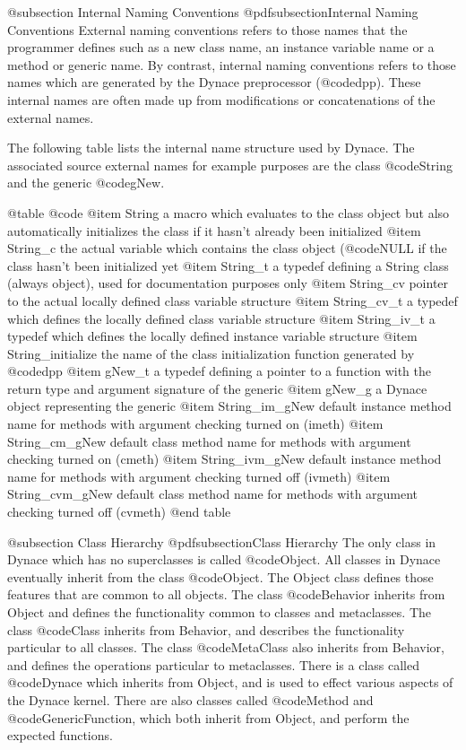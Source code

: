 @subsection Internal Naming Conventions
@pdfsubsection{Internal Naming Conventions}
External naming conventions refers to those names that the programmer
defines such as a new class name, an instance variable name or a method
or generic name.  By contrast, internal naming conventions refers to
those names which are generated by the Dynace preprocessor (@code{dpp}).
These internal names are often made up from modifications or
concatenations of the external names.

The following table lists the internal name structure used by Dynace.
The associated source external names for example purposes are the class
@code{String} and the generic @code{gNew}.

@table @code
@item String
a macro which evaluates to the class object but also automatically
initializes the class if it hasn't already been initialized
@item String_c
the actual variable which contains the class object (@code{NULL} if the
class hasn't been initialized yet
@item String_t
a typedef defining a String class (always object), used for documentation
purposes only
@item String_cv
pointer to the actual locally defined class variable structure
@item String_cv_t
a typedef which defines the locally defined class variable structure
@item String_iv_t
a typedef which defines the locally defined instance variable structure
@item String_initialize
the name of the class initialization function generated by @code{dpp}
@item gNew_t
a typedef defining a pointer to a function with the return type and argument
signature of the generic
@item gNew_g
a Dynace object representing the generic
@item String_im_gNew
default instance method name for methods with argument checking turned on
(imeth)
@item String_cm_gNew
default class method name for methods with argument checking turned on
(cmeth)
@item String_ivm_gNew
default instance method name for methods with argument checking turned off
(ivmeth)
@item String_cvm_gNew
default class method name for methods with argument checking turned off
(cvmeth)
@end table


@subsection Class Hierarchy
@pdfsubsection{Class Hierarchy}
The only class in Dynace which has no superclasses is called
@code{Object}.  All classes in Dynace eventually inherit from the class
@code{Object}.  The Object class defines those features that are common
to all objects.  The class @code{Behavior} inherits from Object and
defines the functionality common to classes and metaclasses.  The class
@code{Class} inherits from Behavior, and describes the functionality
particular to all classes.  The class @code{MetaClass} also inherits
from Behavior, and defines the operations particular to metaclasses.
There is a class called @code{Dynace} which inherits from Object, and is
used to effect various aspects of the Dynace kernel.  There are also
classes called @code{Method} and @code{GenericFunction}, which both inherit
from Object, and perform the expected functions.

